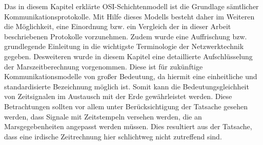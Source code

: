 Das in diesem Kapitel erkl{\"a}rte OSI-Schichtenmodell ist die Grundlage
s{\"a}mtlicher Kommunikationsprotokolle. Mit Hilfe dieses Modells besteht daher
im Weiteren die M{\"o}glichkeit, eine Einordnung bzw. ein Vergleich der in
dieser Arbeit beschriebenen Protokolle vorzunehmen. Zudem wurde eine Auffrischung bzw.
grundlegende Einleitung in die wichtigste Terminologie der Netzwerktechnik
gegeben. Desweiteren wurde in diesem Kapitel eine detaillierte
Aufschl{\"u}sselung der Marszeitberechnung vorgenommen. Diese ist f{\"u}r
zuk{\"u}nftige Kommunikationsmodelle von gro{\ss}er Bedeutung, da hiermit eine
einheitliche und standardisierte Bezeichnung m{\"o}glich ist. Somit kann die
Bedeutungsgleichheit von Zeitsignalen im Austausch mit der Erde
gew{\"a}hrleistet werden. Diese Betrachtungen sollten vor allem unter
Ber{\"u}cksichtigung der Tatsache gesehen werden, dass Signale mit Zeitstempeln
versehen werden, die an Marsgegebenheiten angepasst werden m{\"u}ssen.
Dies resultiert aus der Tatsache, dass eine irdische Zeitrechnung hier
schlichtweg nicht zutreffend sind.


